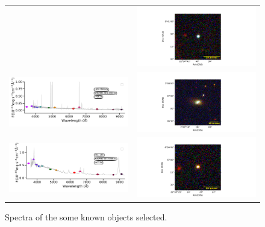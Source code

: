\documentclass[fleqn,usenatbib]{mnras}
\begin{document}
{\begin{figure}
\begin{tabular}{ll}
    & \includegraphics[width=0.4\linewidth, trim=10 0 10 20, clip]{Figs/FASTT1560_338-0_100_r.pdf} \\
    \includegraphics[trim=10 0 10 20, clip]{Figs/spec-0397-51794-0336-STRIPE82-0026-058736.pdf}
    & \includegraphics[width=0.4\linewidth, trim=10 0 10 20, clip]{Figs/LEDA1185205_17-1_200_r.pdf} \\
    \includegraphics[trim=10 0 10 20, clip]{Figs/spec-9217-57934-0839-STRIPE82-0143-016137.pdf}
    & \includegraphics[width=0.4\linewidth, trim=10 0 10 20, clip]{Figs/PHL354_339-0_100_r.pdf} \\
  \end{tabular}
  \caption{Spectra of the some known objects selected.  }
  \label{fig:knonw-objects}
\end{figure}

}
\end{document}
